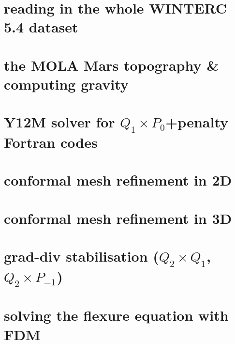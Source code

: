 \documentclass[a4paper,11pt]{report}
\begin{document}
\chapter{reading in the whole WINTERC 5.4 dataset \label{f99}} %

\chapter{the MOLA Mars topography \& computing gravity \label{f100}} %

\chapter{Y12M solver for $Q_1\times P_0$+penalty Fortran codes \label{f101}} %

\chapter{conformal mesh refinement in 2D \label{f102}} %

\chapter{conformal mesh refinement in 3D \label{f103}} %

\chapter{grad-div stabilisation ($Q_2\times Q_1$, $Q_2 \times P_{-1}$) \label{f104}} %

\chapter{solving the flexure equation with FDM  \label{f105}} %
\end{document}
